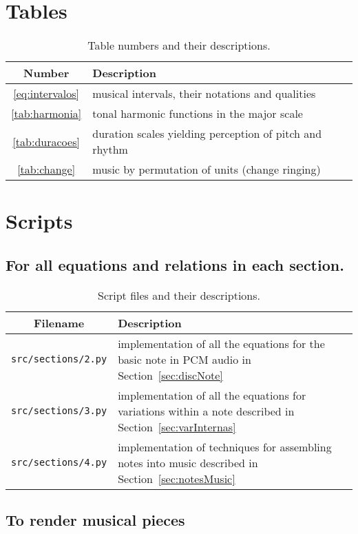 \documentclass{scrreprt}
\newcommand*{\reff}[1]{%
	{\NoHyper\ref{#1}\endNoHyper}%
	  }
\begin{document}
\clearpage
\section{Tables}

\begin{table*}[htp!]
\centering
\caption{Table numbers and their descriptions.}
\begin{tabular}{ c | p{12cm} }
   Number & Description \\\hline
 \reff{eq:intervalos} & musical intervals, their notations and qualities \\
 \reff{tab:harmonia} & tonal harmonic functions in the major scale \\
 \reff{tab:duracoes} & duration scales yielding perception of pitch and rhythm \\
 \reff{tab:change} & music by permutation of units (change ringing) \\
\end{tabular}
\end{table*}

\clearpage
\section{Scripts}
\subsection{For all equations and relations in each section.}

\begin{table*}[htp!]
\centering
\caption{Script files and their descriptions.}
\begin{tabular}{ c | p{12cm} }
   Filename & Description \\\hline
  \texttt{src/sections/2.py} & implementation of all the equations for the basic note in PCM audio in Section~\ref{sec:discNote} \\
  \texttt{src/sections/3.py} & implementation of all the equations for variations within a note described in Section~\ref{sec:varInternas} \\
  \texttt{src/sections/4.py} & implementation of techniques for assembling notes into music described in Section~\ref{sec:notesMusic} \\
\end{tabular}
\end{table*}

\clearpage
\subsection{To render musical pieces}
\end{document}
